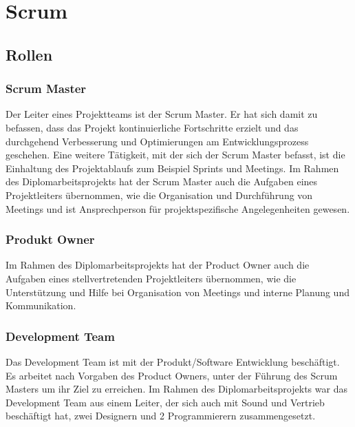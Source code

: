 
\section{Scrum}\label{sec:scrum}

\renewcommand{\kapitelautor}{Autor: Irgendwer} %

\subsection{Rollen}\label{subsec:rollen}

%
\subsubsection{Scrum Master}\label{subsubsec:Scrum-Master}
%
Der Leiter eines Projektteams ist der Scrum Master. Er hat sich damit zu befassen, dass das Projekt kontinuierliche Fortschritte erzielt und das durchgehend Verbesserung und Optimierungen am Entwicklungsprozess geschehen.
Eine weitere Tätigkeit, mit der sich der Scrum Master befasst, ist die Einhaltung des Projektablaufs zum Beispiel Sprints und Meetings.\cite{AsanaScrumMaster}
Im Rahmen des Diplomarbeitsprojekts hat der Scrum Master auch die Aufgaben eines Projektleiters übernommen, wie die Organisation und Durchführung von Meetings und ist Ansprechperson für projektspezifische Angelegenheiten gewesen.
%
\subsubsection{Produkt Owner}\label{subsubsec:Product-Owner}
%
\cite{AsanaProductOwner}

Im Rahmen des Diplomarbeitsprojekts hat der Product Owner auch die Aufgaben eines stellvertretenden Projektleiters übernommen, wie die Unterstützung und Hilfe bei Organisation von Meetings und interne Planung und Kommunikation.
%
\subsubsection{Development Team}\label{subsubsec:Development-Team}
%
Das Development Team ist mit der Produkt/Software Entwicklung beschäftigt. Es arbeitet nach Vorgaben des Product Owners, unter der Führung des Scrum Masters um ihr Ziel zu erreichen.
Im Rahmen des Diplomarbeitsprojekts war das Development Team aus einem Leiter, der sich auch mit Sound und Vertrieb beschäftigt hat, zwei Designern und 2 Programmierern zusammengesetzt.
%
